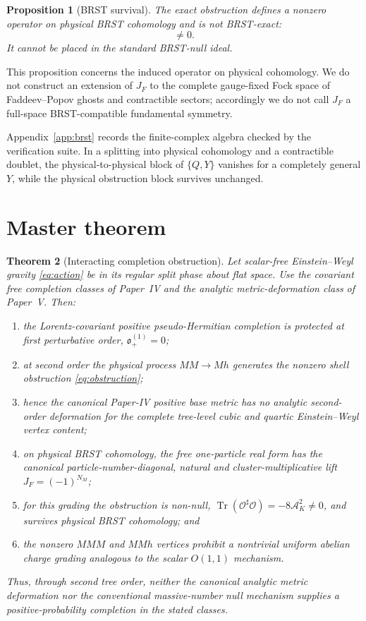 \documentclass[11pt]{article}
\newtheorem{theorem}{Theorem}[section]
\newtheorem{proposition}[theorem]{Proposition}
\theoremstyle{definition}
\theoremstyle{remark}
\newcommand{\ob}{\mathfrak o}
\newcommand{\Tr}{\operatorname{Tr}}
\newcommand{\AK}{\mathcal A_K}
\begin{document}
\begin{proposition}[BRST survival]\label{prop:brst}
The exact obstruction defines a nonzero operator on physical BRST
cohomology and is not BRST-exact:
\begin{equation}
[\mathcal O]\ne0.
\end{equation}
It cannot be placed in the standard BRST-null ideal.
\end{proposition}

This proposition concerns the induced operator on physical cohomology.
We do not construct an extension of $J_F$ to the complete gauge-fixed
Fock space of Faddeev--Popov ghosts and contractible sectors; accordingly
we do not call $J_F$ a full-space BRST-compatible fundamental symmetry.

Appendix~\ref{app:brst} records the finite-complex algebra checked by the
verification suite.
In a splitting into physical cohomology and a contractible doublet, the
physical-to-physical block of $\{Q,Y\}$ vanishes for a completely general
$Y$, while the physical obstruction block survives unchanged.

\section{Master theorem}\label{sec:master}

\begin{theorem}[Interacting completion obstruction]\label{thm:master}
Let scalar-free Einstein--Weyl gravity \eqref{eq:action} be in its regular
split phase about flat space.  Use the covariant free completion
classes of Paper~IV and the analytic metric-deformation class of
Paper~V.  Then:
\begin{enumerate}
\item the Lorentz-covariant positive pseudo-Hermitian completion is
protected at first perturbative order, $\ob_+^{(1)}=0$;
\item at second order the physical process $MM\to Mh$ generates the
nonzero shell obstruction \eqref{eq:obstruction};
\item hence the canonical Paper-IV positive base metric has no analytic
second-order deformation for the complete tree-level cubic and quartic
Einstein--Weyl vertex content;
\item on physical BRST cohomology, the free one-particle real form has
the canonical particle-number-diagonal, natural and
cluster-multiplicative lift $J_F=(-1)^{N_M}$;
\item for this grading the obstruction is non-null,
$\Tr(\mathcal O^\sharp\mathcal O)=-8\AK^2\ne0$, and survives physical
BRST cohomology; and
\item the nonzero $MMM$ and $MMh$ vertices prohibit a nontrivial uniform
abelian charge grading analogous to the scalar $O(1,1)$ mechanism.
\end{enumerate}
Thus, through second tree order, neither the canonical analytic metric
deformation nor the conventional massive-number null mechanism supplies
a positive-probability completion in the stated classes.
\end{theorem}
\end{document}
